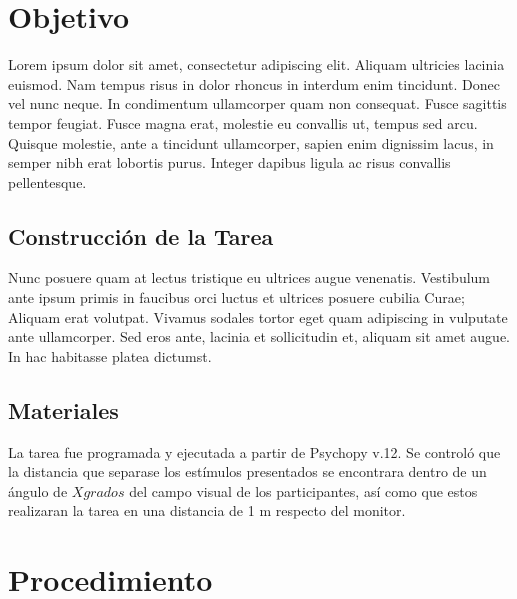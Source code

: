 \section{Objetivo}

Lorem ipsum dolor sit amet, consectetur adipiscing elit. Aliquam ultricies lacinia euismod. Nam tempus risus in dolor rhoncus in interdum enim tincidunt. Donec vel nunc neque. In condimentum ullamcorper quam non consequat. Fusce sagittis tempor feugiat. Fusce magna erat, molestie eu convallis ut, tempus sed arcu. Quisque molestie, ante a tincidunt ullamcorper, sapien enim dignissim lacus, in semper nibh erat lobortis purus. Integer dapibus ligula ac risus convallis pellentesque.

\subsection{Construcción de la Tarea}

Nunc posuere quam at lectus tristique eu ultrices augue venenatis. Vestibulum ante ipsum primis in faucibus orci luctus et ultrices posuere cubilia Curae; Aliquam erat volutpat. Vivamus sodales tortor eget quam adipiscing in vulputate ante ullamcorper. Sed eros ante, lacinia et sollicitudin et, aliquam sit amet augue. In hac habitasse platea dictumst.


\subsection{Materiales}
La tarea fue programada y ejecutada a partir de Psychopy v.12. Se controló que la distancia que separase los estímulos presentados se encontrara dentro de un ángulo de $X grados$ del campo visual de los participantes, así como que estos realizaran la tarea en una distancia de 1 m respecto del monitor.


\section{Procedimiento}

